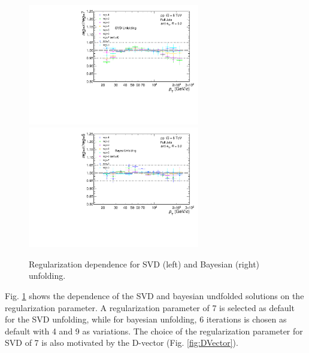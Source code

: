\documentclass[ALICE]{ALICE_analysis_notes}
\begin{document}
\begin{figure}
    \centering
    \begin{multicols}{2}
            \includegraphics[width=7.5cm]{figures/UnfoldingComparisons/Regularizations/RatioRegularizationSvd_R02.pdf}
        \vfill\null 
        \columnbreak
            \includegraphics[width=7.5cm]{figures/UnfoldingComparisons/Regularizations/RatioRegularizationBayes_R02.pdf}
        \vfill\null
    \end{multicols}
    \caption{Regularization dependence for SVD (left) and Bayesian (right) unfolding.}
    \label{fig:RegIter}
\end{figure}

Fig. \ref{fig:RegIter} shows the dependence of the SVD and bayesian undfolded solutions on the regularization parameter. A regularization parameter of 7 is selected as default for the SVD unfolding, while for bayesian unfolding, 6 iterations is chosen as default with 4 and 9 as variations. The choice of the regularization parameter for SVD of 7 is also motivated by the D-vector (Fig. \ref{fig:DVector}). 
\end{document}
